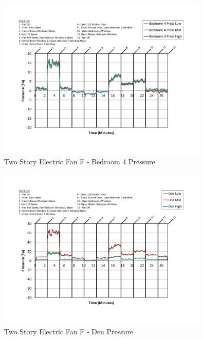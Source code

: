 \documentclass{article}
\begin{document}
\begin{appendices}
	\begin{figure}[H]
		\centering
		\includegraphics[height=3.05in,trim=0.67in 1.1in 0.67in 0.8in,clip=true]{0_Images/Results_Charts/ColdFlow/Two_Story/Electric/F/Bedroom_4_Pressure.pdf}
		\caption{Two Story Electric Fan F - Bedroom 4 Pressure}
	\end{figure}
 

	\begin{figure}[H]
		\centering
		\includegraphics[height=3.05in,trim=0.67in 1.1in 0.67in 0.8in,clip=true]{0_Images/Results_Charts/ColdFlow/Two_Story/Electric/F/Den_Pressure.pdf}
		\caption{Two Story Electric Fan F - Den Pressure}
	\end{figure}
 
	\clearpage


\end{appendices}
\end{document}
